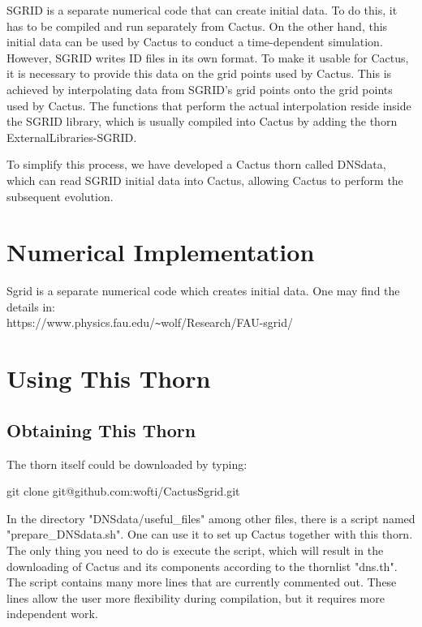 SGRID is a separate numerical code that can create initial data. To do this, it has to be compiled and run separately from Cactus. On the other hand, this initial data can be used by Cactus to conduct a time-dependent simulation. However, SGRID writes ID files in its own format. To make it usable for Cactus, it is necessary to provide this data on the grid points used by Cactus. This is achieved by interpolating data from SGRID's grid points onto the grid points used by Cactus. The functions that perform the actual interpolation reside inside the SGRID library, which is usually compiled into Cactus by adding the thorn ExternalLibraries-SGRID.

To simplify this process, we have developed a Cactus thorn called DNSdata, which can read SGRID initial data into Cactus, allowing Cactus to perform the subsequent evolution.


\section{Numerical Implementation}

Sgrid is a separate numerical code which creates initial data. One may find the details
in: \\
https://www.physics.fau.edu/\verb!~!wolf/Research/FAU-sgrid/

\section{Using This Thorn}

\subsection{Obtaining This Thorn}

The thorn itself could be downloaded by typing:

git clone git@github.com:wofti/CactusSgrid.git

In the directory "DNSdata/useful\_files" among other files, there is a script named "prepare\_DNSdata.sh". One can use it to set up Cactus together with this thorn. The only thing you need to do is execute the script, which will result in the downloading of Cactus and its components according to the thornlist "dns.th". The script contains many more lines that are currently commented out. These lines allow the user more flexibility during compilation, but it requires more independent work.

